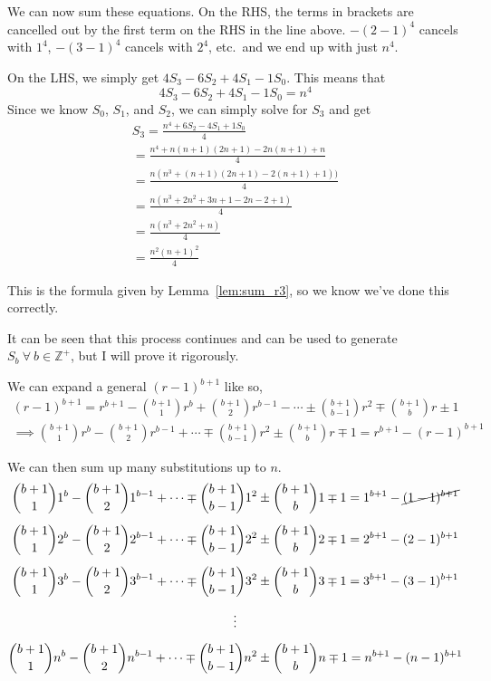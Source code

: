\documentclass[a4paper]{article}
\newcommand{\zp}{\mathbb{Z}^+}
\begin{document}
We can now sum these equations. On the RHS, the terms in brackets are cancelled out by the first term on the RHS in the line above. $-(2-1)^4$ cancels with $1^4$, $-(3-1)^4$ cancels with $2^4$, etc.\ and we end up with just $n^4$.

On the LHS, we simply get $4S_3 - 6S_2 + 4S_1 - 1S_0$. This means that $$4S_3 - 6S_2 + 4S_1 - 1S_0 = n^4$$ Since we know $S_0$, $S_1$, and $S_2$, we can simply solve for $S_3$ and get
\begin{gather*}
S_3 = \frac{n^4 + 6S_2 - 4S_1 + 1S_0}{4}\\[0.5em]
= \frac{n^4 + n(n+1)(2n+1) - 2n(n+1) + n}{4}\\[0.5em]
= \frac{n(n^3 + (n+1)(2n+1) - 2(n+1) + 1))}{4}\\[0.5em]
= \frac{n(n^3 + 2n^2 + 3n + 1 - 2n - 2 + 1)}{4}\\[0.5em]
= \frac{n(n^3 + 2n^2 + n)}{4}\\[0.5em]
= \frac{n^2(n+1)^2}{4}
\end{gather*}

This is the formula given by Lemma~\ref{lem:sum_r3}, so we know we've done this correctly.

It can be seen that this process continues and can be used to generate $S_b\ \forall\ b \in \zp$, but I will prove it rigorously.

We can expand a general $(r-1)^{b+1}$ like so,
\begin{gather*}
(r-1)^{b+1} = r^{b+1} - \binom{b+1}{1}r^b + \binom{b+1}{2}r^{b-1} - \cdots \pm \binom{b+1}{b-1}r^2 \mp \binom{b+1}{b}r \pm 1\\[0.5em]
\implies \binom{b+1}{1}r^b - \binom{b+1}{2}r^{b-1} + \cdots \mp \binom{b+1}{b-1}r^2 \pm \binom{b+1}{b}r \mp 1 = r^{b+1} - (r-1)^{b+1}
\end{gather*}

We can then sum up many substitutions up to $n$.
\begin{gather*}
\binom{b+1}{1}1^b - \binom{b+1}{2}1^{b-1} + \cdots \mp \binom{b+1}{b-1}1^2 \pm \binom{b+1}{b}1 \mp 1 = 1^{b+1} - \cancel{(1-1)^{b+1}}\\[0.5em]
\binom{b+1}{1}2^b - \binom{b+1}{2}2^{b-1} + \cdots \mp \binom{b+1}{b-1}2^2 \pm \binom{b+1}{b}2 \mp 1 = 2^{b+1} - (2-1)^{b+1}\\[0.5em]
\binom{b+1}{1}3^b - \binom{b+1}{2}3^{b-1} + \cdots \mp \binom{b+1}{b-1}3^2 \pm \binom{b+1}{b}3 \mp 1 = 3^{b+1} - (3-1)^{b+1}\\[0.5em]
\vdots\\[0.5em]
\binom{b+1}{1}n^b - \binom{b+1}{2}n^{b-1} + \cdots \mp \binom{b+1}{b-1}n^2 \pm \binom{b+1}{b}n \mp 1 = n^{b+1} - (n-1)^{b+1}
\end{gather*}
\end{document}
